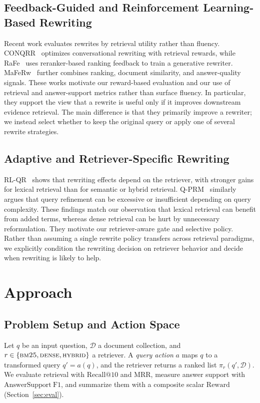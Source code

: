 \documentclass{article}
\begin{document}
\subsection{Feedback-Guided and Reinforcement Learning-Based Rewriting}

Recent work evaluates rewrites by retrieval utility rather than fluency.
CONQRR~\cite{wu2022conqrr} optimizes conversational rewriting with retrieval
rewards, while RaFe~\cite{mao2024rafe} uses reranker-based ranking feedback to
train a generative rewriter. MaFeRw~\cite{zhu2025maferw} further combines
ranking, document similarity, and answer-quality signals. These works motivate
our reward-based evaluation and our use of retrieval and answer-support metrics
rather than surface fluency. In particular, they support the view that a rewrite
is useful only if it improves downstream evidence retrieval. The main difference
is that they primarily improve a rewriter; we instead select whether to keep the
original query or apply one of several rewrite strategies.

\subsection{Adaptive and Retriever-Specific Rewriting}

RL-QR~\cite{cha2025rlqr} shows that rewriting effects depend on the retriever,
with stronger gains for lexical retrieval than for semantic or hybrid retrieval.
Q-PRM~\cite{wang2024qprm} similarly argues that query refinement can be excessive
or insufficient depending on query complexity. These findings match our
observation that lexical retrieval can benefit from added terms, whereas dense
retrieval can be hurt by unnecessary reformulation. They motivate our
retriever-aware gate and selective policy. Rather than assuming a single rewrite
policy transfers across retrieval paradigms, we explicitly condition the
rewriting decision on retriever behavior and decide when rewriting is likely to
help.

\section{Approach}

\subsection{Problem Setup and Action Space}
\label{sec:setup}

Let $q$ be an input question, $\mathcal{D}$ a document collection, and
$r \in \{\textsc{bm25}, \textsc{dense}, \textsc{hybrid}\}$ a retriever. A
\emph{query action} $a$ maps $q$ to a transformed query $q' = a(q)$, and the
retriever returns a ranked list $\pi_r(q', \mathcal{D})$. We evaluate retrieval
with $\mathrm{Recall@10}$ and $\mathrm{MRR}$, measure answer support with
$\mathrm{AnswerSupport\ F1}$, and summarize them with a composite scalar
$\mathrm{Reward}$ (Section~\ref{sec:eval}).
\end{document}
